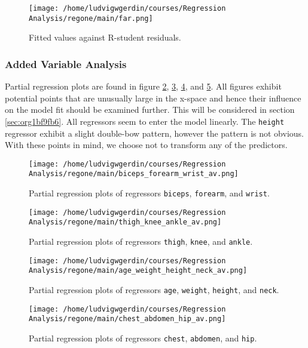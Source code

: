 \documentclass[11pt]{article}
\begin{document}
\begin{figure}[htbp]
\centering
\texttt{[image: /home/ludvigwgerdin/courses/Regression Analysis/regone/main/far.png]}
\caption{\label{fig:org9ae98e4}
Fitted values against R-student residuals.}
\end{figure}

\subsubsection{Added Variable Analysis}
\label{sec:org97f0855}

Partial regression plots are found in figure \ref{fig:orge822e5e}, \ref{fig:org623cde9},
\ref{fig:org9151e88}, and \ref{fig:orgcf7c2db}. All figures exhibit potential points 
that are unusually large in the x-space and hence their influence on the model fit should be 
examined further. This will be considered in section \ref{sec:org1bf9fb6}. All regressors
seem to enter the model linearly. The \texttt{height} regressor exhibit a slight double-bow pattern, however
the pattern is not obvious. With these points in mind, we choose not to transform any of the 
predictors.

\begin{figure}[htbp]
\centering
\texttt{[image: /home/ludvigwgerdin/courses/Regression Analysis/regone/main/biceps\_forearm\_wrist\_av.png]}
\caption{\label{fig:orge822e5e}
Partial regression plots of regressors \texttt{biceps}, \texttt{forearm}, and \texttt{wrist}.}
\end{figure}   

\begin{figure}[htbp]
\centering
\texttt{[image: /home/ludvigwgerdin/courses/Regression Analysis/regone/main/thigh\_knee\_ankle\_av.png]}
\caption{\label{fig:org623cde9}
Partial regression plots of regressors \texttt{thigh}, \texttt{knee}, and \texttt{ankle}.}
\end{figure}

\begin{figure}[htbp]
\centering
\texttt{[image: /home/ludvigwgerdin/courses/Regression Analysis/regone/main/age\_weight\_height\_neck\_av.png]}
\caption{\label{fig:org9151e88}
Partial regression plots of regressors \texttt{age}, \texttt{weight}, \texttt{height}, and \texttt{neck}.}
\end{figure}

\begin{figure}[htbp]
\centering
\texttt{[image: /home/ludvigwgerdin/courses/Regression Analysis/regone/main/chest\_abdomen\_hip\_av.png]}
\caption{\label{fig:orgcf7c2db}
Partial regression plots of regressors \texttt{chest}, \texttt{abdomen}, and \texttt{hip}.}
\end{figure}
\end{document}
